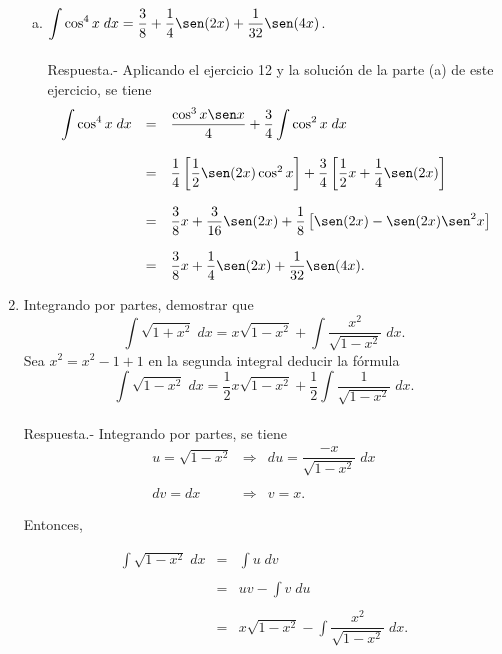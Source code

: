 \begin{enumerate}[\bfseries 1.]
\begin{enumerate}[(a)]
	    \item $\displaystyle\int \cos^4 x\; dx = \dfrac{3}{8}+\dfrac{1}{4}\sen(2x)+\dfrac{1}{32}\sen(4x)$.\\\\
		Respuesta.-\; Aplicando el ejercicio 12 y la solución de la parte (a) de este ejercicio, se tiene
		$$
		\begin{array}{rcl}
		    \displaystyle\int \cos^4 x\; dx &=& \dfrac{\cos^3x\sen x}{4}+\dfrac{3}{4}\displaystyle\int \cos^2 x\; dx\\\\
						    &=& \dfrac{1}{4}\left[\dfrac{1}{2}\sen(2x)\cos^2 x\right]+\dfrac{3}{4}\left[\dfrac{1}{2}x+\dfrac{1}{4}\sen(2x)\right]\\\\
						    &=&\dfrac{3}{8}x+\dfrac{3}{16}\sen(2x)+\dfrac{1}{8}\left[\sen(2x)-\sen(2x)\sen^2 x\right]\\\\
						    &=& \dfrac{3}{8}x+\dfrac{1}{4}\sen(2x)+\dfrac{1}{32}\sen(4x).
		\end{array}
		$$
		\vspace{.5cm}

	\end{enumerate}

    \item Integrando por partes, demostrar que
    $$\int \sqrt{1+x^2}\; dx = x\sqrt{1-x^2}+\int \dfrac{x^2}{\sqrt{1-x^2}}\; dx.$$
    Sea $x^2=x^2-1+1$ en la segunda integral deducir la fórmula
    $$\int \sqrt{1-x^2}\; dx = \dfrac{1}{2}x\sqrt{1-x^2}+\dfrac{1}{2}\int \dfrac{1}{\sqrt{1-x^2}}\; dx.$$\\
	Respuesta.-\; Integrando por partes, se tiene
	$$
	\begin{array}{rcl}
	    u=\sqrt{1-x^2} &\Rightarrow& du=\dfrac{-x}{\sqrt{1-x^2}}\; dx\\\\
	    dv=dx &\Rightarrow& v=x.
	\end{array}
	$$

	Entonces,

	$$
	\begin{array}{rcl}
	    \displaystyle\int \sqrt{1-x^2}\; dx &=& \displaystyle\int u\; dv \\\\
						&=& uv-\displaystyle\int v\; du\\\\
						&=& x\sqrt{1-x^2}-\displaystyle\int \dfrac{x^2}{\sqrt{1-x^2}}\; dx.
	\end{array}
	$$


\end{enumerate}
